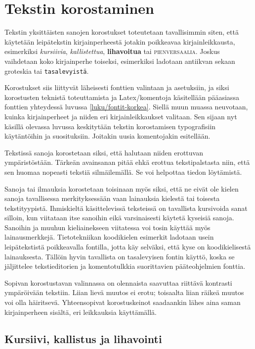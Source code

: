 \section{Tekstin korostaminen}
\label{luku/korostus}

Tekstin yksittäisten sanojen korostukset toteutetaan tavallisimmin
siten, että käytetään leipätekstin kirjainperheestä jotakin poikkeavaa
kirjainleikkausta, esimerkiksi \textit{kursiivia},
\textsl{kallistettua}, \textbf{lihavoitua} tai \textsc{pienversaalia}.
Joskus vaihdetaan koko kirjainperhe toiseksi, esimerkiksi ladotaan
\textrm{antiikvan} sekaan \textsf{groteskia} tai \texttt{tasalevyistä}.

Korostukset siis liittyvät läheisesti fonttien valintaan ja asetuksiin,
ja siksi korostusten teknistä toteuttamista ja Latex\-/komentoja
käsitellään pääasiassa fonttien yhteydessä luvussa
\ref{luku/fontit-korkea}. Siellä muun muassa neuvotaan, kuinka
kirjainperheet ja niiden eri kirjainleikkaukset valitaan. Sen sijaan nyt
käsillä olevassa luvussa keskitytään tekstin korostamisen typografisiin
käytäntöihin ja suosituksiin. Joitakin uusia komentojakin esitellään.

Tekstissä sanoja korostetaan siksi, että halutaan niiden erottuvan
ympäristöstään. Tärkeän avainsanan pitää ehkä erottua tekstipalstasta
niin, että sen huomaa nopeasti tekstiä silmäilemällä. Se voi helpottaa
tiedon löytämistä.

Sanoja tai ilmauksia korostetaan toisinaan myös siksi, että ne eivät ole
kielen sanoja tavallisessa merkityksessään vaan lainauksia kielestä tai
toisesta tekstityypistä. Ihmiskieltä käsittelevissä teksteissä on
tavallista kursivoida sanat silloin, kun viitataan itse sanoihin eikä
varsinaisesti käytetä kyseisiä sanoja. Sanoihin ja muuhun kieliainekseen
viitatessa voi tosin käyttää myös lainausmerkkejä. Tietotekniikan
koodikielen esimerkit ladotaan usein leipätekstistä poikkeavalla
fontilla, jotta käy selväksi, että kyse on koodikielisestä lainauksesta.
Tällöin hyvin tavallista on tasalevyisen fontin käyttö, koska se
jäljittelee tekstieditorien ja komentotulkkia suorittavien
pääteohjelmien fonttia.

Sopivan korostustavan valinnassa on olennaista saavuttaa riittävä
kontrasti ympäröivään tekstiin. Liian lievä muutos ei erotu; toisaalta
liian räikeä muutos voi olla häiritsevä. Yhteensopivat korostuskeinot
saadaankin lähes aina saman kirjainperheen sisältä, eri leikkauksia
käyttämällä.

\subsection{Kursiivi, kallistus ja lihavointi}
\label{luku/peruskorostukset}

